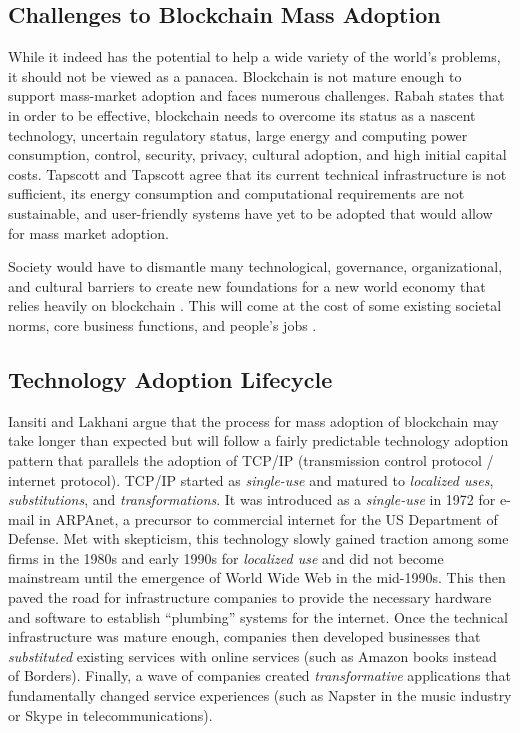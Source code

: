 \documentclass[sigconf]{acmart}
\begin{document}
\subsection{Challenges to Blockchain Mass Adoption}
While it indeed has the potential to help a wide variety of the world's problems, it should not be viewed as a panacea.  Blockchain is not mature enough to support mass-market adoption and faces numerous challenges. Rabah \cite{rabah2017overview} states that in order to be effective, blockchain needs to overcome its status as a nascent technology, uncertain regulatory status, large energy and computing power consumption, control, security, privacy, cultural adoption, and high initial capital costs. Tapscott and Tapscott \cite{tapscott} agree that its current technical infrastructure is not sufficient, its energy consumption and computational requirements are not sustainable, and user-friendly systems have yet to be adopted that would allow for mass market adoption.

Society would have to dismantle many technological, governance, organizational, and cultural barriers to create new foundations for a new world economy that relies heavily on blockchain \cite{hbr}. This will come at the cost of some existing societal norms, core business functions, and people's jobs \cite{hbr} \cite{rabah2017overview}. 

\subsection{Technology Adoption Lifecycle}
Iansiti and Lakhani \cite{hbr} argue that the process for mass adoption of blockchain may take longer than expected but will follow a fairly predictable technology adoption pattern that parallels the adoption of TCP/IP (transmission control protocol / internet protocol). TCP/IP started as \textit{single-use} and matured to \textit{localized uses}, \textit{substitutions}, and \textit{transformations}. It was introduced as a \textit{single-use} in 1972 for e-mail in ARPAnet, a precursor to commercial internet for the US Department of Defense. Met with skepticism, this technology slowly gained traction among some firms in the 1980s and early 1990s for \textit{localized use} and did not become mainstream until the emergence of World Wide Web in the mid-1990s. This then paved the road for infrastructure companies to provide the necessary hardware and software to establish ``plumbing'' systems for the internet. Once the technical infrastructure was mature enough, companies then developed businesses that \textit{substituted} existing services with online services (such as Amazon books instead of Borders). Finally, a wave of companies created \textit{transformative} applications that fundamentally changed service experiences (such as Napster in the music industry or Skype in telecommunications).
\end{document}
